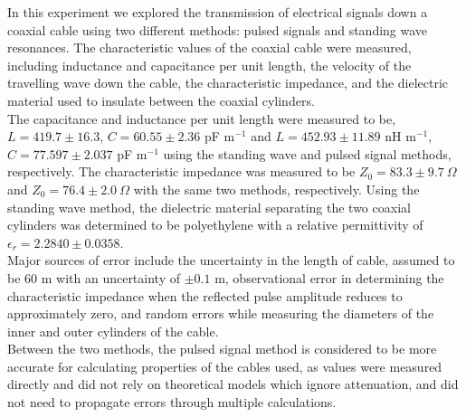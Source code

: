 In this experiment we explored the transmission of electrical signals down a coaxial cable using two different methods: pulsed signals and standing wave resonances. The characteristic values of the coaxial cable were measured, including inductance and capacitance per unit length, the velocity of the travelling wave down the cable, the characteristic impedance, and the dielectric material used to insulate between the coaxial cylinders. \\

The capacitance and inductance per unit length were measured to be, $L = 419.7 \pm 16.3$, $C = 60.55 \pm 2.36$ pF m$^{-1}$ and  $L = 452.93 \pm 11.89$ nH m$^{-1}$, $C = 77.597 \pm 2.037$ pF m$^{-1}$ using the standing wave and pulsed signal methods, respectively. The characteristic impedance was measured to be $Z_0 = 83.3 \pm 9.7 \ \Omega$ and $Z_0 = 76.4 \pm 2.0 \ \Omega$ with the same two methods, respectively. Using the standing wave method, the dielectric material separating the two coaxial cylinders was determined to be polyethylene with a relative permittivity of $\epsilon_r = 2.2840 \pm 0.0358$.\\

Major sources of error include the uncertainty in the length of cable, assumed to be 60 m with an uncertainty of $\pm0.1$ m, observational error in determining the characteristic impedance when the reflected pulse amplitude reduces to approximately zero, and random errors while measuring the diameters of the inner and outer cylinders of the cable.  \\

Between the two methods, the pulsed signal method is considered to be more accurate for calculating properties of the cables used, as values were measured directly and did not rely on theoretical models which ignore attenuation, and did not need to propagate errors through multiple calculations.\\